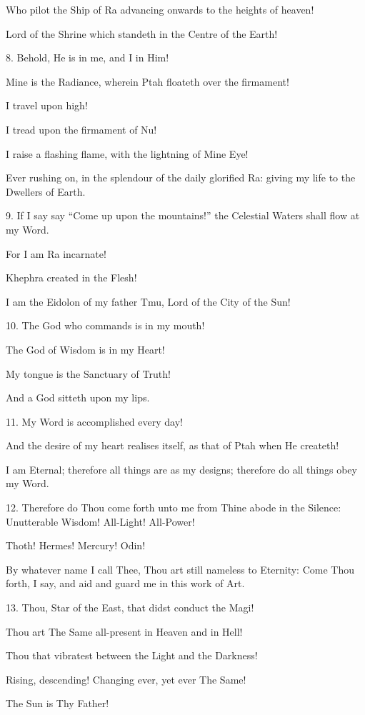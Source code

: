 Who pilot the Ship of Ra advancing onwards to the heights of heaven!

Lord of the Shrine which standeth in the Centre of the Earth!

8. Behold, He is in me, and I in Him!

Mine is the Radiance, wherein Ptah floateth over the firmament!

I travel upon high!

I tread upon the firmament of Nu!

I raise a flashing flame, with the lightning of Mine Eye!

Ever rushing on, in the splendour of the daily glorified Ra: giving my life to the Dwellers of Earth.

9. If I say say \enquote{Come up upon the mountains!} the Celestial Waters shall flow at my Word.

For I am Ra incarnate!

Khephra created in the Flesh!

I am the Eidolon of my father Tmu, Lord of the City of the Sun!

10. The God who commands is in my mouth!

The God of Wisdom is in my Heart!

My tongue is the Sanctuary of Truth!

And a God sitteth upon my lips.

11. My Word is accomplished every day!

And the desire of my heart realises itself, as that of Ptah when He createth!

I am Eternal; therefore all things are as my designs; therefore do all things obey my Word.

12. Therefore do Thou come forth unto me from Thine abode in the Silence: Unutterable Wisdom! All-Light! All-Power!

Thoth! Hermes! Mercury! Odin!

By whatever name I call Thee, Thou art still nameless to Eternity: Come Thou forth, I say, and aid and guard me in this work of Art.

13. Thou, Star of the East, that didst conduct the Magi!

Thou art The Same all-present in Heaven and in Hell!

Thou that vibratest between the Light and the Darkness!

Rising, descending! Changing ever, yet ever The Same!

The Sun is Thy Father!


